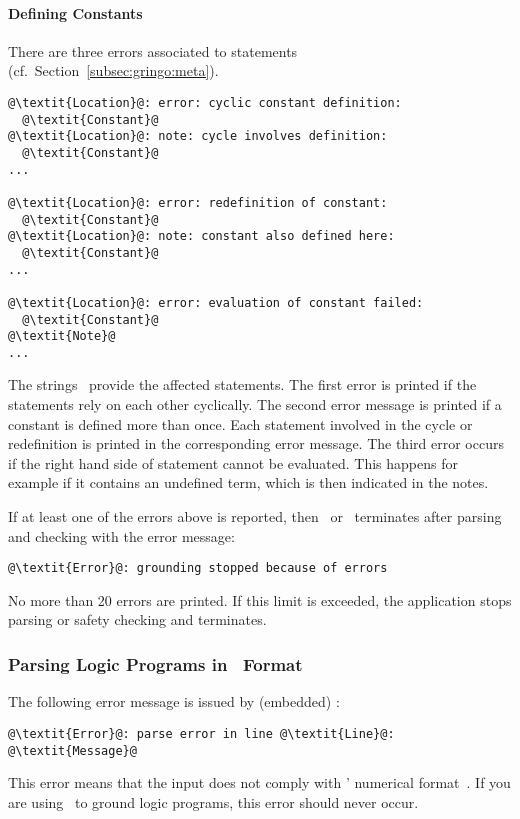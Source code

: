 \paragraph{Defining Constants}
There are three errors associated to  statements (cf.~Section~\ref{subsec:gringo:meta}).
\begin{lstlisting}[numbers=none,escapechar=@]
@\textit{Location}@: error: cyclic constant definition:
  @\textit{Constant}@
@\textit{Location}@: note: cycle involves definition:
  @\textit{Constant}@
...

@\textit{Location}@: error: redefinition of constant:
  @\textit{Constant}@
@\textit{Location}@: note: constant also defined here:
  @\textit{Constant}@
...

@\textit{Location}@: error: evaluation of constant failed:
  @\textit{Constant}@
@\textit{Note}@
...
\end{lstlisting}
The strings~ provide the affected  statements.
The first error is printed if the statements rely on each other cyclically.
The second error message is printed if a constant is defined more than once.
Each statement involved in the cycle or redefinition is printed in the corresponding error message.
The third error occurs if the right hand side of  statement cannot be evaluated.
This happens for example if it contains an undefined term, which is then indicated in the notes.

If at least one of the errors above is reported,
then \gringo\ or \clingo\ terminates after parsing and checking with the error message:
\begin{lstlisting}[numbers=none,escapechar=@]
@\textit{Error}@: grounding stopped because of errors
\end{lstlisting}

\begin{note}
No more than 20 errors are printed.
If this limit is exceeded, the application stops parsing or safety checking and terminates.
\end{note}

\subsubsection{Parsing Logic Programs in \smodels\ Format}\label{subsec:error:lparse}
The following error message is issued by (embedded) \clasp:
%
\begin{lstlisting}[numbers=none,escapechar=@]
@\textit{Error}@: parse error in line @\textit{Line}@: @\textit{Message}@
\end{lstlisting}
%
This error means that the input does not comply with \smodels' numerical format~\cite{lparseManual}.
If you are using \gringo\ to ground logic programs,
this error should never occur.

